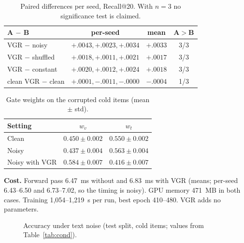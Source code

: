 \documentclass[conference]{IEEEtran}
\begin{document}
\begin{table}[!t]
\centering\footnotesize
\caption{Paired differences per seed, Recall@20. With $n=3$ no significance test is claimed.}
\label{tab:paired}
\begin{tabular}{@{}lccc@{}}
\toprule
A $-$ B & per-seed & mean & A$>$B \\
\midrule
VGR $-$ noisy & $+.0043, +.0023, +.0034$ & $+.0033$ & 3/3 \\
VGR $-$ shuffled & $+.0018, +.0011, +.0021$ & $+.0017$ & 3/3 \\
VGR $-$ constant & $+.0020, +.0012, +.0024$ & $+.0018$ & 3/3 \\
clean VGR $-$ clean & $+.0001, -.0011, -.0000$ & $-.0004$ & 1/3 \\
\bottomrule
\end{tabular}
\end{table}

\begin{table}[!t]
\centering\footnotesize
\caption{Gate weights on the corrupted cold items (mean $\pm$ std).}
\label{tab:gate}
\begin{tabular}{@{}lcc@{}}
\toprule
Setting & $w_v$ & $w_t$ \\
\midrule
Clean & $0.450 \pm 0.002$ & $0.550 \pm 0.002$ \\
Noisy & $0.437 \pm 0.004$ & $0.563 \pm 0.004$ \\
Noisy with VGR & $0.584 \pm 0.007$ & $0.416 \pm 0.007$ \\
\bottomrule
\end{tabular}
\end{table}

\textbf{Cost.} Forward pass 6.47~ms without and 6.83~ms with VGR (means; per-seed 6.43--6.50 and 6.73--7.02, so the timing is noisy). GPU memory 471~MB in both cases. Training 1,054--1,219~s per run, best epoch 410--480. VGR adds no parameters.

\begin{figure}[!t]
\centering
{}
\caption{Accuracy under text noise (test split, cold items; values from Table~\ref{tab:cond}).}
\label{fig:acc}
\end{figure}
\end{document}

